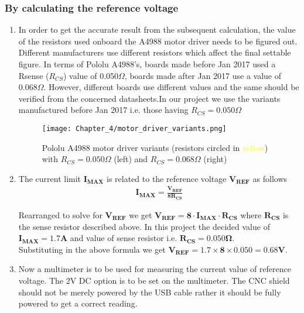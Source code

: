 \subsubsection*{By calculating the reference voltage}

\begin{enumerate}
 \item In order to get the accurate result from the subsequent calculation, the value of the resistors used onboard the A4988 motor driver needs to be figured out. Different manufacturers use different resistors which affect the final settable figure. In terms of Pololu A4988's, boards made before Jan 2017 used a Rsense ($R_{CS}$) value of 0.050$\Omega$, boards made after Jan 2017 use a value of 0.068$\Omega$. However, different boards use different values and the same should be verified from the concerned datasheets.In our project we use the variants manufactured before Jan 2017 i.e. those having $R_{CS} = 0.050\Omega$

       \begin{figure}[h]
        \centering
        \texttt{[image: Chapter\_4/motor\_driver\_variants.png]}
        \caption{Pololu A4988 motor driver variants (resistors circled in \textcolor{yellow}{yellow}) with  $R_{CS} = 0.050\Omega$ (left) and $R_{CS} = 0.068\Omega$ (right)}
        \label{fig:driver_variants}
       \end{figure}

 \item  The current limit $\boldsymbol{I_{MAX}}$ is related to the reference voltage $\boldsymbol{V_{REF}}$ as follows
       \begin{align}
        \boldsymbol{I_{MAX} = \frac{V_{REF}}{8R_{CS}}} \nonumber
       \end{align}

       Rearranged to solve for $\boldsymbol{V_{REF}}$ we get
       $ \boldsymbol{V_{REF} = 8 \cdot I_{MAX} \cdot R_{CS}}$  where $\boldsymbol{R_{CS}}$ is the sense resistor described above. In this project the decided value of $\boldsymbol{I_{MAX}= 1.7A}$  and value of sense resistor i.e. $\boldsymbol{R_{CS} = 0.050\Omega}$. \\
       Substituting in the above formula we get  $\boldsymbol{V_{REF} = 1.7\times8\times0.050 = 0.68V}$.

 \item  Now a multimeter is to be used for measuring the current value of reference voltage. The 2V DC option is to be set on the multimeter. The CNC shield should not be merely powered by the USB cable rather it should be fully powered to get a correct reading.


\end{enumerate}
